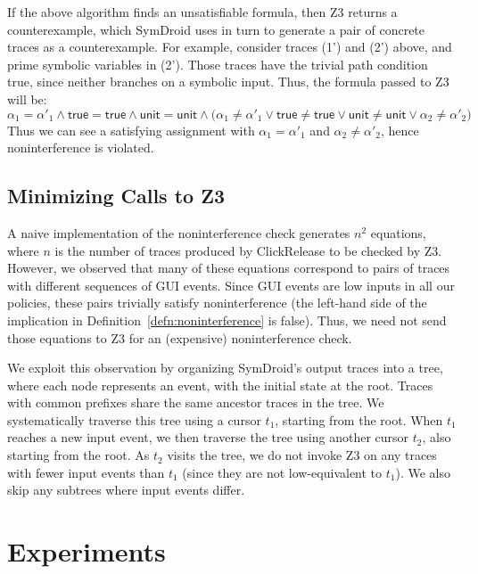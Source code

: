 \documentclass{llncs}
\newcommand{\code}[1]{\textsf{#1}} \newcommand{\bcode}[1]{\texttt{#1}}
\newcommand{\sfmt}[1]{\textsf{#1}}
\newcommand{\sunit}{\sfmt{unit}}
\newcommand{\toolname}{ClickRelease\xspace}
\begin{document}
If the above algorithm finds an unsatisfiable formula, then Z3 returns a counterexample, which
SymDroid uses in turn to generate a pair of concrete traces
as a counterexample.
For example, consider traces (1') and (2') above, and prime
symbolic variables in (2'). Those traces have the trivial path
condition \sfmt{true}, since neither branches on a symbolic
input. Thus, the formula passed to Z3 will be:
\begin{displaymath}
    \alpha_1 = \alpha'_1 \land \code{true} = \code{true} \land \sunit = \sunit
    \land
    \big(\alpha_1 \neq \alpha'_1 \vee \code{true} \neq \code{true} \vee
    \sunit \neq \sunit \vee \alpha_2 \neq \alpha'_2 \big)
\end{displaymath}
Thus we can see a satisfying
assignment with $\alpha_1 = \alpha'_1$ and $\alpha_2 \neq \alpha'_2$,
hence noninterference is violated.


\subsection{Minimizing Calls to Z3}
\label{sec:z3-tree}

A naive implementation of the noninterference check generates $n^2$
equations, where $n$ is the number of traces produced by \toolname{}
to be checked by Z3. However, we observed that many of these equations
correspond to pairs of traces with different sequences of GUI
events. Since GUI events are low inputs in all our policies, these
pairs trivially satisfy noninterference (the left-hand side of the
implication in Definition~\ref{defn:noninterference} is false).
 Thus, we need not send those
equations to Z3 for an (expensive) noninterference check.

We exploit this observation by organizing SymDroid's output traces
into a tree, where each node represents an event, with
the initial state at the root. Traces with common prefixes share the
same ancestor traces in the tree. We systematically traverse this tree
using a cursor $t_1$, starting from the root. When $t_1$ reaches a new
input event, we then traverse the tree using another cursor $t_2$,
also starting from the root. As $t_2$ visits the tree, we do not
invoke Z3 on any traces with fewer input events than $t_1$ (since they
are not low-equivalent to $t_1$). We also skip any subtrees where 
input events differ.


\section{Experiments}
\label{sec:experiments}
\end{document}
